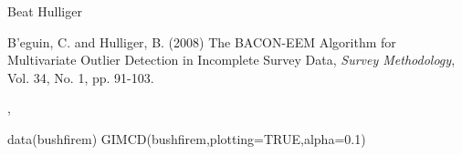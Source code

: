 %
\begin{Author}\relax
Beat Hulliger 
\end{Author}
%
\begin{References}\relax
B\bsl{}'eguin, C. and Hulliger, B. (2008) The BACON-EEM Algorithm for Multivariate Outlier Detection 
in Incomplete Survey Data, \emph{Survey Methodology}, Vol. 34, No. 1, pp. 91-103.
\end{References}
%
\begin{SeeAlso}\relax
  ,  
\end{SeeAlso}
%
\begin{Examples}
\begin{ExampleCode}
data(bushfirem)
GIMCD(bushfirem,plotting=TRUE,alpha=0.1)
\end{ExampleCode}
\end{Examples}
